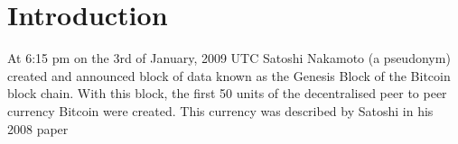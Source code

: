 \section{Introduction}
%
%



% 
% 
% 
% 

At 6:15 pm on the 3rd of January, 2009 UTC Satoshi Nakamoto (a pseudonym) created and announced block of data known as the Genesis Block of the Bitcoin block chain. With this block, the first 50 units of the decentralised peer to peer currency Bitcoin were created.  This currency was described by Satoshi in his 2008 paper

